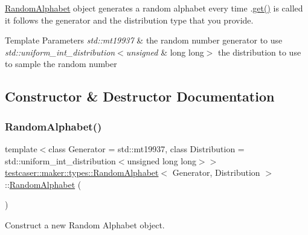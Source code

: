 \mbox{\hyperlink{structtestcaser_1_1maker_1_1types_1_1RandomAlphabet}{Random\+Alphabet}} object generates a random alphabet every time .\mbox{\hyperlink{structtestcaser_1_1maker_1_1types_1_1RandomAlphabet_a6498f1e44b84cb66c1c1dc6de642b218}{get()}} is called it follows the generator and the distribution type that you provide. 


\begin{DoxyTemplParams}{Template Parameters}
{\em std\+::mt19937} & the random number generator to use \\
\hline
{\em std\+::uniform\+\_\+int\+\_\+distribution$<$unsigned} & long long$>$ the distribution to use to sample the random number \\
\hline
\end{DoxyTemplParams}


\subsection{Constructor \& Destructor Documentation}
\mbox{\label{structtestcaser_1_1maker_1_1types_1_1RandomAlphabet_ab4cab36c953e73837f726215309577ba}} 
\subsubsection{\texorpdfstring{RandomAlphabet()}{RandomAlphabet()}}
{\footnotesize\ttfamily template$<$class Generator = std\+::mt19937, class Distribution = std\+::uniform\+\_\+int\+\_\+distribution$<$unsigned long long$>$$>$ \\
\mbox{\hyperlink{structtestcaser_1_1maker_1_1types_1_1RandomAlphabet}{testcaser\+::maker\+::types\+::\+Random\+Alphabet}}$<$ Generator, Distribution $>$\+::\mbox{\hyperlink{structtestcaser_1_1maker_1_1types_1_1RandomAlphabet}{Random\+Alphabet}} (\begin{DoxyParamCaption}{ }\end{DoxyParamCaption})\hspace{0.3cm}{\ttfamily [inline]}}



Construct a new Random Alphabet object. 



